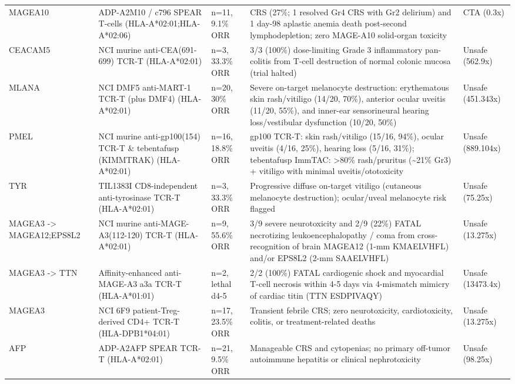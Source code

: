 \documentclass[10pt,letterpaper]{article}
\begin{document}
\begin{table}[htbp]
\begin{tabularx}{\textwidth}{p{2.5cm} p{2.9cm} p{2.2cm} X p{2.5cm}}
MAGEA10 & ADP-A2M10 / c796 SPEAR T-cells (HLA-A*02:01;HLA-A*02:06) & n=11, 9.1\% ORR & CRS (27\%; 1 resolved Gr4 CRS with Gr2 delirium) and 1 day-98 aplastic anemia death post-second lymphodepletion; zero MAGE-A10 solid-organ toxicity & CTA (0.3x) \\
CEACAM5 & NCI murine anti-CEA(691-699) TCR-T (HLA-A*02:01) & n=3, 33.3\% ORR & 3/3 (100\%) dose-limiting Grade 3 inflammatory pan-colitis from T-cell destruction of normal colonic mucosa (trial halted) & Unsafe (562.9x) \\
MLANA & NCI DMF5 anti-MART-1 TCR-T (plus DMF4) (HLA-A*02:01) & n=20, 30\% ORR & Severe on-target melanocyte destruction: erythematous skin rash/vitiligo (14/20, 70\%), anterior ocular uveitis (11/20, 55\%), and inner-ear sensorineural hearing loss/vestibular dysfunction (10/20, 50\%) & Unsafe (451.343x) \\
PMEL & NCI murine anti-gp100(154) TCR-T \& tebentafusp (KIMMTRAK) (HLA-A*02:01) & n=16, 18.8\% ORR & gp100 TCR-T: skin rash/vitiligo (15/16, 94\%), ocular uveitis (4/16, 25\%), hearing loss (5/16, 31\%); tebentafusp ImmTAC: >80\% rash/pruritus (\textasciitilde{}21\% Gr3) + vitiligo with minimal uveitis/ototoxicity & Unsafe (889.104x) \\
TYR & TIL1383I CD8-independent anti-tyrosinase TCR-T (HLA-A*02:01) & n=3, 33.3\% ORR & Progressive diffuse on-target vitiligo (cutaneous melanocyte destruction); ocular/uveal melanocyte risk flagged & Unsafe (75.25x) \\
MAGEA3 -> MAGEA12;EPS8L2 & NCI murine anti-MAGE-A3(112-120) TCR-T (HLA-A*02:01) & n=9, 55.6\% ORR & 3/9 severe neurotoxicity and 2/9 (22\%) FATAL necrotizing leukoencephalopathy / coma from cross-recognition of brain MAGEA12 (1-mm KMAELVHFL) and/or EPS8L2 (2-mm SAAELVHFL) & Unsafe (13.275x) \\
MAGEA3 -> TTN & Affinity-enhanced anti-MAGE-A3 a3a TCR-T (HLA-A*01:01) & n=2, lethal d4-5 & 2/2 (100\%) FATAL cardiogenic shock and myocardial T-cell necrosis within 4-5 days via 4-mismatch mimicry of cardiac titin (TTN ESDPIVAQY) & Unsafe (13473.4x) \\
MAGEA3 & NCI 6F9 patient-Treg-derived CD4+ TCR-T (HLA-DPB1*04:01) & n=17, 23.5\% ORR & Transient febrile CRS; zero neurotoxicity, cardiotoxicity, colitis, or treatment-related deaths & Unsafe (13.275x) \\
AFP & ADP-A2AFP SPEAR TCR-T (HLA-A*02:01) & n=21, 9.5\% ORR & Manageable CRS and cytopenias; no primary off-tumor autoimmune hepatitis or clinical nephrotoxicity & Unsafe (98.25x) \\

\end{tabularx}
\end{table}
\end{document}
